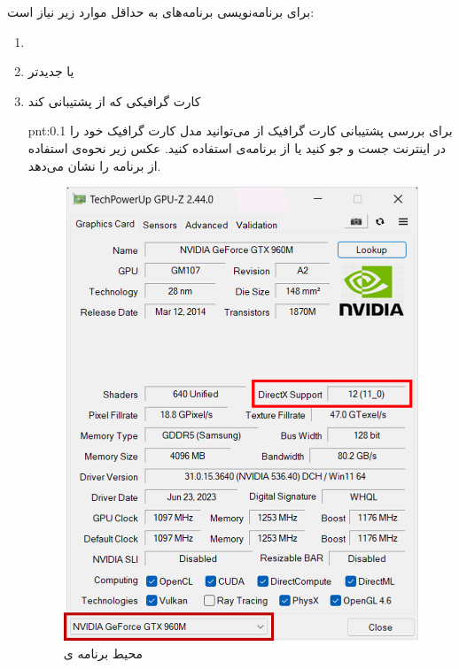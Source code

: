 {
    \Large
    \begin{spacing}{1.5}
        برای برنامه‌نویسی برنامه‌های  به حداقل موارد زیر نیاز است:
        \begin{enumerate}[label=\textbf{\arabic*}.]
            \item {}
            \item { یا جدیدتر}
            \item {کارت گرافیکی که از  پشتیبانی کند
                \begin{point}{pnt:0.1}
                    \Large
                    برای بررسی پشتیبانی کارت گرافیک از  می‌توانید مدل کارت گرافیک خود را در اینترنت جست و جو کنید یا از برنامه‌ی  استفاده کنید. عکس زیر نحوه‌ی استفاده از برنامه را نشان می‌دهد.

                    \begin{figure}[H]
                        \centering
                        \setlength{\belowcaptionskip}{-10pt}
                        \includegraphics[scale=0.50]{Images/3/3.Intro.0.1}
                        \caption*{\Large محیط برنامه ی  \textbf{\vspace{12pt}}}
                    \end{figure}
                \end{point}
            }
        \end{enumerate}
    \end{spacing}
}

